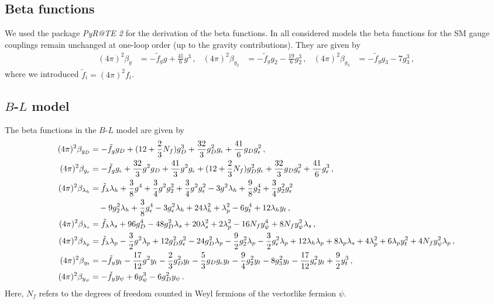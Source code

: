 \documentclass[aps,prd,twocolumn,preprintnumbers,superscriptaddress,nobibnotes,floatfix,longbibliography]{revtex4-1}
\begin{document}
\begin{widetext}
\section{Beta functions}
\label{sec:beta-functions}
We used the package \textit{PyR@TE 2} \cite{Lyonnet:2013dna,Lyonnet:2016xiz} for the derivation of the beta functions.
In all considered models the beta functions for the SM gauge couplings remain unchanged at one-loop order (up to the gravity contributions).
They are given by
\begin{align}
(4 \pi)^2 \beta_{g} &=  - \tilde f_g g + \frac{41}{6} g^3 \,,
&
(4 \pi)^2 \beta_{g_2} &=  - \tilde  f_g g_2-\frac{19}{6} g_2^3 \,,
&
(4 \pi)^2 \beta_{g_3} &=  - \tilde f_g g_3-7 g_3^3  \,,
\end{align}
where we introduced $\tilde f_i = (4 \pi)^2 f_i$.

\subsection{\texorpdfstring{$B$-$L$}{B-L} model}
The beta functions in the $B$-$L$ model are given by
\begin{align}
(4 \pi)^2 \beta_{g_D} &= -\tilde f_g g_D+(12 + \frac23 N_f) g_D^3+\frac{32}{3} g_D^2 g_\epsilon + \frac{41}{6} g_D g_\epsilon ^2 \,,\\
(4 \pi)^2 \beta_{g_\epsilon } &=  -\tilde f_g g_\epsilon +\frac{32}{3} g^2 g_D + \frac{41}{3} g^2 g_\epsilon + (12 + \frac23 N_f) g_D^2 g_\epsilon +\frac{32}{3} g_D g_\epsilon ^2 +\frac{41}{6} g_\epsilon ^3 \,,\\
(4 \pi)^2 \beta_{\lambda_h} &=  \tilde f_\lambda \lambda_h+\frac{3}{8} g^4 + \frac{3}{4} g^2 g_2^2 + \frac{3}{4} g^2 g_\epsilon ^2-3 g^2 \lambda_h+\frac{9}{8} g_2^4 + \frac{3}{4} g_2^2 g_\epsilon ^2 \notag \\
   &\quad -9 g_2^2 \lambda_h+\frac{3}{8} g_\epsilon ^4-3 g_\epsilon ^2 \lambda_h+24 \lambda_h^2+\lambda_p^2-6 y_t^4+12 \lambda_h y_t \,,\\
(4 \pi)^2 \beta_{\lambda_s} &=   \tilde f_\lambda \lambda_s+ 96 g_D^4-48 g_D^2 \lambda_s+20 \lambda_s^2+2 \lambda_p^2  - 16 N_f y_\psi^4 + 8 N_f y_\psi^2 \lambda_s  \,,\\
(4 \pi)^2 \beta_{\lambda_p} &= \tilde f_\lambda \lambda_p-\frac{3}{2} g^2 \lambda_p+12 g_D^2 g_\epsilon ^2 - 24 g_D^2 \lambda_p-\frac{9}{2} g_2^2 \lambda_p - \frac{3}{2} g_\epsilon ^2 \lambda_p +12 \lambda_h \lambda_p + 8 \lambda_p \lambda_s+4 \lambda_p^2+6 \lambda_p y_t^2 + 4 N_f y_\psi^2 \lambda_p  \,,\\
(4 \pi)^2 \beta_{y_t} &=  - \tilde f_y y_t - \frac{17}{12} g^2 y_t - \frac{2}{3} g_D^2 y_t - \frac{5}{3} g_D g_\epsilon y_t - \frac{9}{4} g_2^2 y_t - 8 g_3^2 y_t-\frac{17}{12} g_\epsilon ^2 y_t+\frac{9}{2} y_t^3 \,, \\
(4 \pi)^2 \beta_{y_\psi} &= - \tilde f_y y_\psi  + 6 y_\psi^3  - 6 g_D^2 y_\psi \,.
\end{align}
Here, $N_f$ refers to the degrees of freedom counted in Weyl fermions of the vectorlike fermion $\psi$.


\end{widetext}
\end{document}
